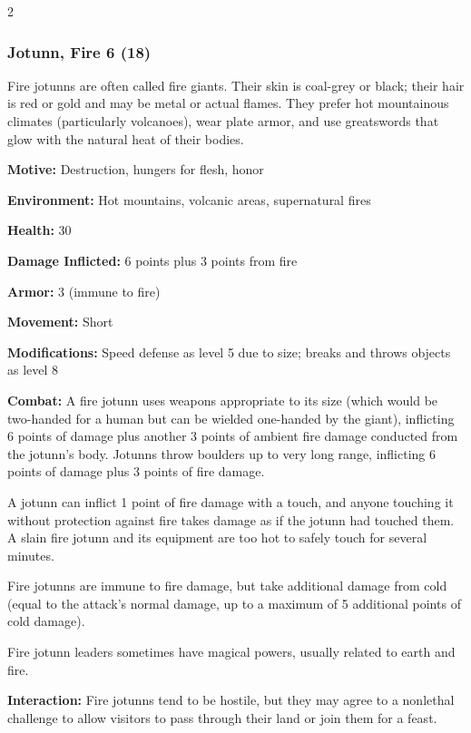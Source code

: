 \begin{multicols}{2}
\subsubsection{Jotunn, Fire 6 (18)}

Fire jotunns are often called fire giants. Their skin is coal-grey or black; their hair is red or gold and may be metal or actual flames. They prefer hot mountainous climates (particularly volcanoes), wear plate armor, and use greatswords that glow with the natural heat of their bodies. 

\textbf{Motive:} Destruction, hungers for flesh, honor 

\textbf{Environment:} Hot mountains, volcanic areas, supernatural fires 

\textbf{Health:} 30 

\textbf{Damage Inflicted:} 6 points plus 3 points from fire 

\textbf{Armor:} 3 (immune to fire) 

\textbf{Movement:} Short 

\textbf{Modifications:} Speed defense as level 5 due to size; breaks and throws objects as level 8 

\textbf{Combat:} A fire jotunn uses weapons appropriate to its size (which would be two-handed for a human but can be wielded one-handed by the giant), inflicting 6 points of damage plus another 3 points of ambient fire damage conducted from the jotunn’s body. Jotunns throw boulders up to very long range, inflicting 6 points of damage plus 3 points of fire damage. 

A jotunn can inflict 1 point of fire damage with a touch, and anyone touching it without protection against fire takes damage as if the jotunn had touched them. A slain fire jotunn and its equipment are too hot to safely touch for several minutes. 

Fire jotunns are immune to fire damage, but take additional damage from cold (equal to the attack’s normal damage, up to a maximum of 5 additional points of cold damage). 

Fire jotunn leaders sometimes have magical powers, usually related to earth and fire. 

\textbf{Interaction:} Fire jotunns tend to be hostile, but they may agree to a nonlethal challenge to allow visitors to pass through their land or join them for a feast. 


\end{multicols}

